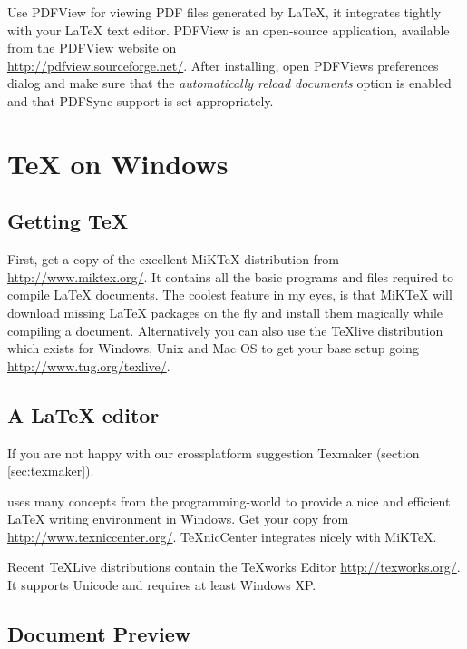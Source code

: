 Use PDFView for viewing PDF files generated by \LaTeX{}, it integrates tightly
with your \LaTeX{} text editor. PDFView is an open-source application, available from the PDFView website on\\
\url{http://pdfview.sourceforge.net/}. After installing, open
PDFViews preferences dialog and make sure that the \emph{automatically reload
documents} option is enabled and that PDFSync support is set appropriately.

\section{\TeX{} on Windows}

\subsection{Getting \TeX{}}

First, get a copy of the excellent MiK\TeX{} distribution from\\
\url{http://www.miktex.org/}. It contains all the basic programs and files
required to compile \LaTeX{} documents.  The coolest feature in my eyes, is
that MiK\TeX{} will download missing \LaTeX{} packages on the fly and install them
magically while compiling a document. Alternatively you can also use
the TeXlive distribution which exists for Windows, Unix and Mac OS to
get your base setup going \url{http://www.tug.org/texlive/}.

\subsection{A \LaTeX{} editor}

If you are not happy with our crossplatform suggestion Texmaker (section \ref{sec:texmaker}).

 uses many concepts from the programming-world to provide a nice and
efficient \LaTeX{} writing environment in Windows. Get your copy from\\
\url{http://www.texniccenter.org/}. TeXnicCenter integrates nicely with
MiKTeX.

Recent \TeX Live distributions contain the \TeX{}works Editor
\url{http://texworks.org/}. It supports Unicode and requires at least Windows XP.

\subsection{Document Preview}


